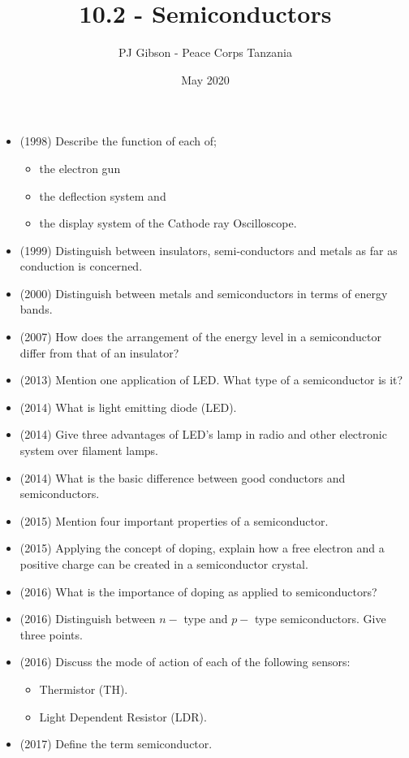 \documentclass{article}
\title{\textbf{10.2 - Semiconductors}}
\author{PJ Gibson - Peace Corps Tanzania}
\date{May 2020}
\begin{document}
\maketitle

\begin{itemize}
\item (1998)  Describe the function of each of;
 \begin{itemize}
\item the electron gun
\item the deflection system and
\item the display system of the Cathode ray Oscilloscope.
\end{itemize}
\item (1999)  Distinguish between insulators, semi-conductors and metals as far as conduction is concerned.
\item (2000)  Distinguish between metals and semiconductors in terms of energy bands. 
\item (2007)  How does the arrangement of the energy level in a semiconductor differ from that of an insulator?
\item (2013)  Mention one application of LED. What type of a semiconductor is it?
\item (2014)  What is light emitting diode (LED).
\item (2014)  Give three advantages of LED's lamp in radio and other electronic system over filament lamps.
\item (2014)  What is the basic difference between good conductors and semiconductors.
\item (2015)  Mention four important properties of a semiconductor.
\item (2015)  Applying the concept of doping, explain how a free electron and a positive charge can be created in a semiconductor crystal. 
\item (2016)  What is the importance of doping as applied to semiconductors?
\item (2016)  Distinguish between $ n-$ type and $ p-$ type semiconductors.  Give three points.
\item (2016)  Discuss the mode of action of each of the following sensors:
 \begin{itemize}
\item Thermistor (TH).
\item Light Dependent Resistor (LDR).
\end{itemize}
\item (2017)  Define the term semiconductor.

\end{itemize}
\end{document}
